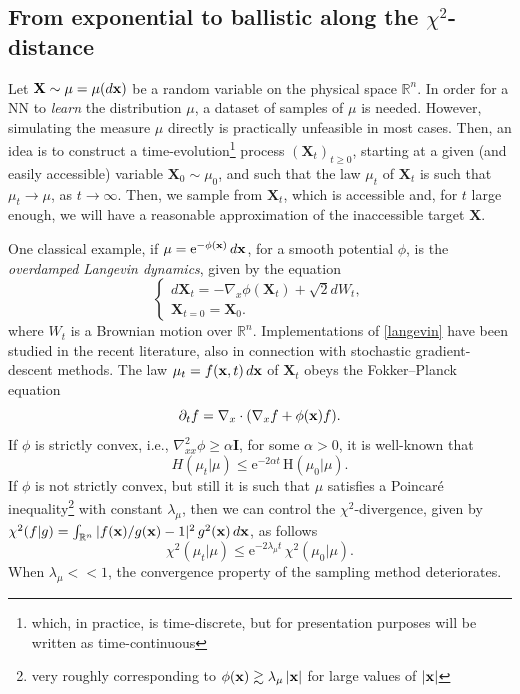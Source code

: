 \documentclass{article}
\renewcommand{\leq}{\leqslant}
\renewcommand{\geq}{\geqslant}
\renewcommand{\to}{\rightarrow}
\def \Id{\mathbf{I}}
\def\bx{{\bf x}}
\def \erre{\mathbb{R}}
\begin{document}
\subsection{From exponential to ballistic along the \texorpdfstring{$\chi^2$-distance}{}}
Let $\mathbf{X} \sim \mu=\mu(d\bx)$ be a random variable on the physical space $\mathbb R^n$. In order for a NN to \emph{learn} the distribution $\mu$, a dataset of samples of $\mu$ is needed. However, simulating the measure $\mu$ directly is practically unfeasible in most cases. 
Then, an idea\cite{Wibisono2018,Welling2011} is to construct a time-evolution\footnote{which, in practice, is time-discrete, but for presentation purposes will be written as time-continuous} process $(\mathbf{X}_t)_{t\geq0}$, starting at a given (and easily accessible) variable $\mathbf X_0 \sim \mu_0$, and such that the law $\mu_t$ of $\mathbf X_t$ is such that $\mu_t \to \mu$, as $t\to\infty$. Then, we sample from $\mathbf{X}_t$, which is accessible and, for $t$ large enough, we will have a reasonable approximation of the inaccessible target $\mathbf{X}$.  

One classical example, if $\mu = \mathrm{e}^{-\phi(\bx)} \, d\bx$, for a smooth potential $\phi$, is the \emph{overdamped Langevin dynamics}, given by the equation
\begin{equation}\label{langevin}
\begin{cases}
    d \mathbf X_t = -\nabla_x \phi(\mathbf X_t) + \sqrt{2} dW_t,  \\
    \mathbf{X}_{t=0} = \mathbf{X}_0.
\end{cases}
\end{equation}
where $W_t$ is a Brownian motion over $\mathbb R^n$. Implementations of \eqref{langevin} have been studied in the recent literature, also in connection with stochastic gradient-descent methods. 
The law $\mu_t=f(\bx,t) \, d\bx$ of $\mathbf{X}_t$ obeys the Fokker--Planck equation
\begin{equation}\label{OU}
    \partial_t f = \nabla_x \cdot( \nabla_x f + \phi(\bx) f).
\end{equation}
If $\phi$ is strictly convex, i.e., $\nabla^2_{xx} \phi \geq \alpha \Id$, for some $\alpha>0$, it is well-known that\cite{bakryemery}  
\[
H(\mu_t|\mu) \leq \mathrm{e}^{- 2\alpha t} \, \mathrm{H}(\mu_0|\mu).
\]
If $\phi$ is not strictly convex, but still it is such that $\mu$ satisfies a Poincar\'e inequality\footnote{very roughly corresponding to $\phi(\bx) \gtrsim \lambda_\mu \, |\bx|$ for large values of $|\bx|$} with constant $\lambda_\mu$, then we can control the $\chi^2$-divergence, given by $\chi^2(f|g) = \int_{\erre^n} |f(\bx)/g(\bx) -1|^2 \, g^2(\bx) \, d\bx$, as follows 
\begin{equation}\label{chi2}
\chi^2(\mu_t|\mu) \leq \mathrm{e}^{-2 \lambda_\mu t} \, \chi^2(\mu_0|\mu).
\end{equation}
When $\lambda_\mu << 1$, the convergence property of the sampling method deteriorates. 
\end{document}
